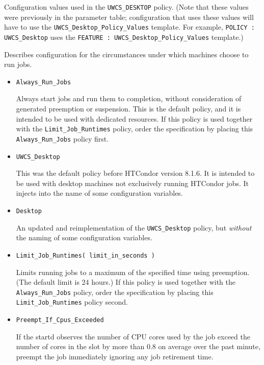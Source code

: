 \begin{description}
\begin{itemize}
	Configuration values used in the \texttt{UWCS\_DESKTOP} policy.
	(Note that these values were previously in the parameter table;
	configuration that uses these values will have to use the
	\texttt{UWCS\_Desktop\_Policy\_Values} template.  For example,
	\texttt{POLICY : UWCS\_Desktop} uses the
	\texttt{FEATURE : UWCS\_Desktop\_Policy\_Values} template.)
  \end{itemize}

\label{usecategory:POLICY}
\item[\MacroNI{POLICY category}]
  Describes configuration for the circumstances under which
  machines choose to run jobs.
  \begin{itemize}

    \item \texttt{Always\_Run\_Jobs}

    Always start jobs and run them to completion, without consideration of
     generated preemption or suspension.
    This is the default policy, and it is intended to be used with dedicated
    resources.
    If this policy is used together with the \texttt{Limit\_Job\_Runtimes}
    policy,
    order the specification by placing this \texttt{Always\_Run\_Jobs} 
    policy first. 

    \item \texttt{UWCS\_Desktop}

    This was the default policy before HTCondor version 8.1.6.
    It is intended to be used with desktop machines not exclusively running
    HTCondor jobs.
    It injects  into the name of some configuration variables.

    \item \texttt{Desktop}

    An updated and reimplementation of the \texttt{UWCS\_Desktop} policy,
    but \emph{without} the  naming of some configuration variables.

    \item \texttt{Limit\_Job\_Runtimes( limit\_in\_seconds )}

    Limits running jobs to a maximum of the specified time using preemption.
	(The default limit is 24 hours.)
    If this policy is used together with the \texttt{Always\_Run\_Jobs} policy,
    order the specification by placing this \texttt{Limit\_Job\_Runtimes} 
    policy second. 

	\item \texttt{Preempt\_If\_Cpus\_Exceeded}

	If the startd observes the number of CPU cores used by the job exceed
	the number of cores in the slot by more than 0.8 on average over the past
	minute, preempt the job immediately
	ignoring any job retirement time.


\end{itemize}
\end{description}
